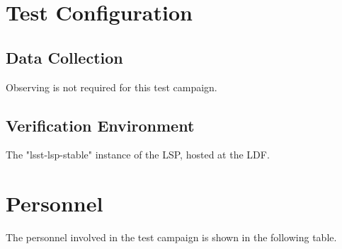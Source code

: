 \documentclass[DM,lsstdraft,STR,toc]{lsstdoc}
\begin{document}
\section{Test Configuration}
\label{sect:configuration}

\subsection{Data Collection}

  Observing is not required for this test campaign.

\subsection{Verification Environment}
\label{sect:hwconf}
  The "lsst-lsp-stable" instance of the LSP, hosted at the LDF.





\newpage
\section{Personnel}
\label{sect:personnel}

The personnel involved in the test campaign is shown in the following table.
\end{document}
